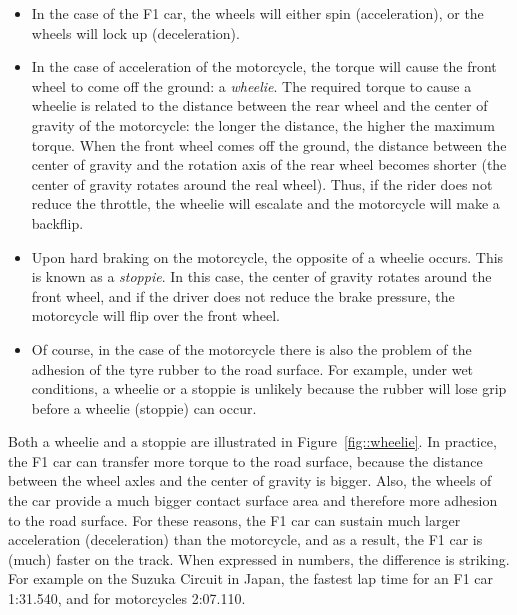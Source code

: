 \documentclass[12pt]{article}
\begin{document}
\begin{itemize}
\item In the case of the F1 car, the wheels will either spin (acceleration), or the wheels will lock up (deceleration).

\item In the case of acceleration of the motorcycle, the torque will cause the front wheel to come off the ground: a \emph{wheelie}. The required torque to cause a wheelie is related to the distance between the rear wheel and the center of gravity of the motorcycle: the longer the distance, the higher the maximum torque. When the front wheel comes off the ground, the distance between the center of gravity and the rotation axis of the rear wheel becomes shorter (the center of gravity rotates around the real wheel). Thus, if the rider does not reduce the throttle, the wheelie will escalate and the motorcycle will make a backflip.

\item Upon hard braking on the motorcycle, the opposite of a wheelie occurs. This is known as a \emph{stoppie}. In this case, the center of gravity rotates around the front wheel, and if the driver does not reduce the brake pressure, the motorcycle will flip over the front wheel.

\item Of course, in the case of the motorcycle there is also the problem of the adhesion of the tyre rubber to the road surface. For example, under wet conditions, a wheelie or a stoppie is unlikely because the rubber will lose grip before a wheelie (stoppie) can occur.
\end{itemize}

Both a wheelie and a stoppie are illustrated in Figure~\ref{fig::wheelie}. In practice, the F1 car can transfer more torque to the road surface, because the distance between the wheel axles and the center of gravity is bigger. Also, the wheels of the car provide a much bigger contact surface area and therefore more adhesion to the road surface. For these reasons, the F1 car can sustain much larger acceleration (deceleration) than the motorcycle, and as a result, the F1 car is (much) faster on the track. When expressed in numbers, the difference is striking. For example on the Suzuka Circuit in Japan, the fastest lap time for an F1 car 1:31.540, and for motorcycles 2:07.110.
\end{document}
